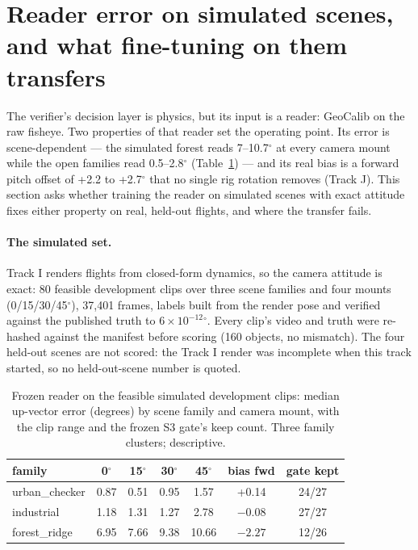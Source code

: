 
\section{Reader error on simulated scenes, and what fine-tuning on them transfers}
\label{sec:l-reader-sim}

The verifier's decision layer is physics, but its input is a reader: GeoCalib on the raw fisheye.
Two properties of that reader set the operating point. Its error is scene-dependent --- the
simulated forest reads 7--10.7$^\circ$ at every camera mount while the open families read
0.5--2.8$^\circ$ (Table~\ref{tab:l-grid}) --- and its real bias is a forward pitch offset of
+2.2 to +2.7$^\circ$ that no single rig rotation removes (Track J). This section asks whether
training the reader on simulated scenes with exact attitude fixes either property on real,
held-out flights, and where the transfer fails.

\paragraph{The simulated set.} Track I renders flights from closed-form dynamics, so the camera
attitude is exact: 80 feasible development clips over three scene families and four mounts
(0/15/30/45$^\circ$), 37{,}401 frames, labels built from the render pose and verified against the
published truth to $6\times10^{-12}$$^\circ$. Every clip's video and truth were re-hashed against
the manifest before scoring (160 objects, no mismatch). The four held-out scenes are not scored:
the Track I render was incomplete when this track started, so no held-out-scene number is quoted.

\begin{table}[t]
\centering
\caption{Frozen reader on the feasible simulated development clips: median up-vector error
(degrees) by scene family and camera mount, with the clip range and the frozen S3 gate's keep
count. Three family clusters; descriptive.}
\label{tab:l-grid}
\begin{tabular}{lcccccc}
\toprule
family & 0$^\circ$ & 15$^\circ$ & 30$^\circ$ & 45$^\circ$ & bias fwd & gate kept \\
\midrule
urban\_checker & 0.87 & 0.51 & 0.95 & 1.57 & +0.14 & 24/27 \\
industrial     & 1.18 & 1.31 & 1.27 & 2.78 & $-0.08$ & 27/27 \\
forest\_ridge  & 6.95 & 7.66 & 9.38 & 10.66 & $-2.27$ & 12/26 \\
\bottomrule
\end{tabular}
\end{table}

